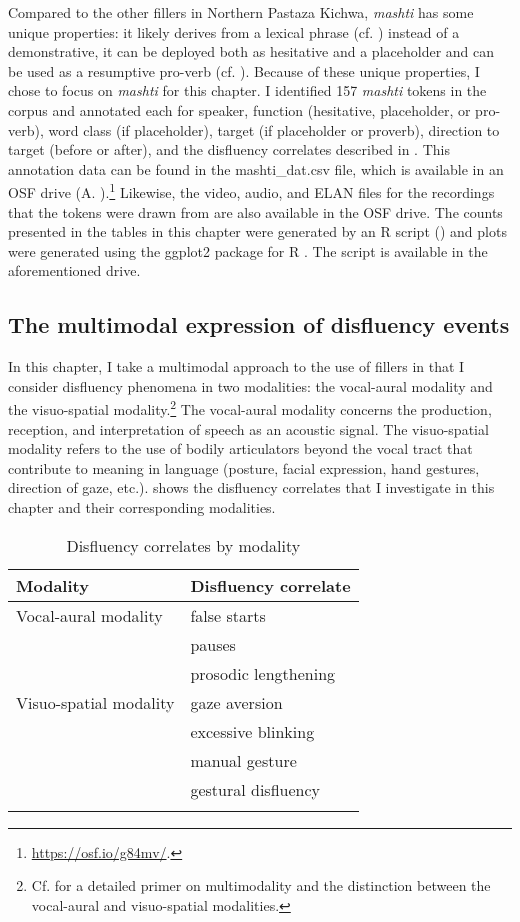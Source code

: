 \documentclass[output=paper]{langscibook}
\begin{document}
Compared to the other fillers in Northern Pastaza Kichwa, \textit{mashti} has some unique properties: it likely derives from a lexical phrase (cf. ) instead of a demonstrative, it can be deployed both as hesitative and a placeholder and can be used as a resumptive pro-verb (cf. ). Because of these unique properties, I chose to focus on \textit{mashti} for this chapter. I identified 157 \textit{mashti} tokens in the corpus and annotated each for speaker, function (hesitative, placeholder, or pro-verb), word class (if placeholder), target (if placeholder or proverb), direction to target (before or after), and the disfluency correlates described in . This annotation data can be found in the mashti\_dat.csv file, which is available in an OSF drive (A. \citealt{Rice2023}).\footnote{\url{https://osf.io/g84mv/}.} Likewise, the video, audio, and ELAN files for the recordings that the tokens were drawn from are also available in the OSF drive. The counts presented in the tables in this chapter were generated by an R script (\citeyear{Team2013}) and plots were generated using the ggplot2 package for R \citep{Wickham2016}. The script is available in the aforementioned drive. 

\subsection{The multimodal expression of disfluency events}
\label{sec:rice:2.4}

In this chapter, I take a multimodal approach to the use of fillers in that I consider disfluency phenomena in two modalities: the vocal-aural modality and the visuo-spatial modality.\footnote{Cf. \citet{Stivers2005} for a detailed primer on multimodality and the distinction between the vocal-aural and visuo-spatial modalities.} The vocal-aural modality concerns the production, reception, and interpretation of speech as an acoustic signal. The visuo-spatial modality refers to the use of bodily articulators beyond the vocal tract that contribute to meaning in language (posture, facial expression, hand gestures, direction of gaze, etc.).  shows the disfluency correlates that I investigate in this chapter and their corresponding modalities.

\begin{table}
\begin{tabular}{ll}
\lsptoprule
Modality & Disfluency correlate\\
\midrule
Vocal-aural modality & false starts\\
& pauses\\
& prosodic lengthening\\
Visuo-spatial modality & gaze aversion\\
& excessive blinking\\
& manual gesture\\
& gestural disfluency\\
\lspbottomrule
\end{tabular}
\caption{\label{tab:rice:2} Disfluency correlates by modality}
\end{table}
\end{document}
